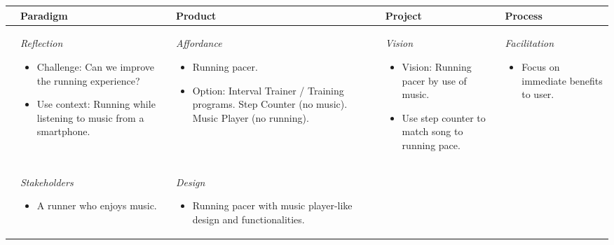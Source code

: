 \begin{table}
\footnotesize
\begin{tabular}{|l|l|l|l|l|} \hline
         & \textbf{Paradigm} & \textbf{Product} & \textbf{Project} & \textbf{Process} \\ \hline
\parbox[t][4cm][c]{0.02\textwidth}{} %
	& \parbox[t][][c]{0.20\textwidth}{ 
		\textit{Reflection}
		\begin{itemize}[leftmargin=*]
		\item Challenge: Can we improve the running experience?
		\item Use context: Running while listening to music from a smartphone.
		\end{itemize}
	}
	& \parbox[t][][c]{0.20\textwidth}{ 
		\textit{Affordance} 
		\begin{itemize}[leftmargin=*]
		\item Running pacer. 
		\item Option: 
			Interval Trainer / Training programs. \newline
			Step Counter (no music). \newline
			Music Player (no running). 
		\end{itemize}	 
	}
	& \parbox[t][][c]{0.20\textwidth}{  
		\textit{Vision} 
		\begin{itemize}[leftmargin=*]
		\item Vision: Running pacer by use of music. 
		\item Use step counter to match song to running pace.
		\end{itemize}
	}
    & \parbox[t][][c]{0.20\textwidth}{ 
	    \textit{Facilitation}
   		\begin{itemize}[leftmargin=*]
		\item Focus on immediate benefits to user.
		\end{itemize}
   } \\ \hline
\parbox[t][5cm][c]{0.02\textwidth}{}
	& \parbox[t][][c]{0.20\textwidth}{ 
	    \textit{Stakeholders} 
		\begin{itemize}[leftmargin=*]
		\item A runner who enjoys music.
		\end{itemize}
	}
	& \parbox[t][][c]{0.20\textwidth}{ 
		\textit{Design} 
		\begin{itemize}[leftmargin=*]
		\item Running pacer with music player-like design and functionalities.  
		\end{itemize}
}
\end{tabular}
\end{table}
